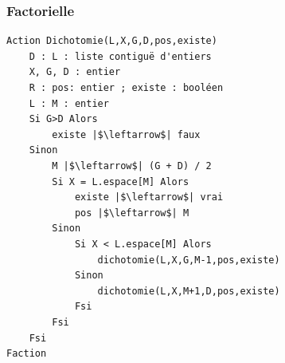 \documentclass[table,handout,tikz,12pt,svgnames]{beamer}
\begin{document}
\begin{frame}[fragile=singleslide]
	\frametitle{Factorielle}
\vspace{-0.15cm}
						\begin{verbatim}
Action Dichotomie(L,X,G,D,pos,existe)
	D : L : liste contiguë d'entiers
	X, G, D : entier
	R : pos: entier ; existe : booléen
	L : M : entier
	Si G>D Alors
		existe |$\leftarrow$| faux
	Sinon
		M |$\leftarrow$| (G + D) / 2
		Si X = L.espace[M] Alors
			existe |$\leftarrow$| vrai
			pos |$\leftarrow$| M
		Sinon
			Si X < L.espace[M] Alors
				dichotomie(L,X,G,M-1,pos,existe)
			Sinon
				dichotomie(L,X,M+1,D,pos,existe)
			Fsi
		Fsi
	Fsi
Faction
						\end{verbatim}		
\end{frame}
\end{document}

